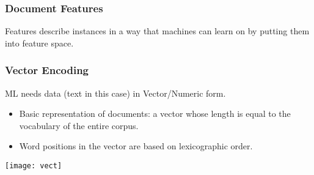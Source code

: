 \begin{frame}[fragile]\frametitle{Document Features}
Features describe instances in a 
way that machines can learn on by 
putting them into feature space.

\hfill
{}
\end{frame}

\begin{frame}[fragile]\frametitle{Vector Encoding}
ML needs data (text in this case) in Vector/Numeric form.
\begin{itemize}
\item  Basic representation of documents: a vector whose length is equal to the vocabulary of the entire corpus. 
\item  Word positions in the vector are based on lexicographic order.
\end{itemize}
\begin{center}
\texttt{[image: vect]}
\end{center}
\end{frame}

